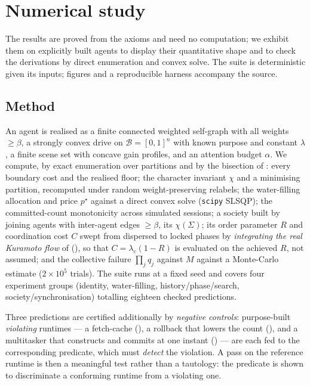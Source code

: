 \documentclass[11pt,twocolumn,a4paper]{article}
\newcommand{\floorc}{\beta}          %
\newcommand{\Char}{\chi}             %
\newcommand{\Beh}{\mathcal{B}}       %
\newcommand{\lam}{\lambda}
\newcommand{\att}{\alpha}            %
\newcommand{\price}{p^{\star}}       %
\newcommand{\Ord}{R}                 %
\newcommand{\Soc}{\Sigma}            %
\begin{document}
\section{Numerical study}
\label{sec:validation}

The results are proved from the axioms and need no computation; we exhibit
them on explicitly built agents to display their quantitative shape and to
check the derivations by direct enumeration and convex solve. The suite is
deterministic given its inputs; figures and a reproducible harness
accompany the source.

\subsection{Method}

An agent is realised as a finite connected weighted self-graph with all
weights $\ge\floorc$, a strongly convex drive on $\Beh=[0,1]^n$ with known
purpose and constant $\lam$, a finite scene set with concave gain profiles,
and an attention budget $\att$. We compute, by exact enumeration over
partitions and by the bisection of : every boundary
cost and the realised floor; the character invariant $\Char$ and a
minimising partition, recomputed under random weight-preserving relabels;
the water-filling allocation and price $\price$ against a direct convex
solve (\texttt{scipy} SLSQP); the committed-count monotonicity across
simulated sessions; a society built by joining agents with inter-agent edges
$\ge\floorc$, its $\Char(\Soc)$; its order parameter $\Ord$ and coordination
cost $C$ swept from dispersed to locked phases by \emph{integrating the real
Kuramoto flow} of  (), so that
$C=\lambda_c(1-\Ord)$ is evaluated on the achieved $\Ord$, not assumed; and
the collective failure $\prod_j q_j$ against $M$ against a Monte-Carlo
estimate ($2\times10^5$ trials). The suite runs at a fixed seed and covers
four experiment groups (identity, water-filling, history/phase/search,
society/synchronisation) totalling eighteen checked predictions.

Three predictions are certified additionally by \emph{negative controls}:
purpose-built \emph{violating} runtimes --- a fetch-cache
(), a rollback that lowers the count
(), and a multitasker that constructs and commits at one
instant () --- are each fed to the corresponding
predicate, which must \emph{detect} the violation. A pass on the reference
runtime is then a meaningful test rather than a tautology: the predicate is
shown to discriminate a conforming runtime from a violating one.
\end{document}
